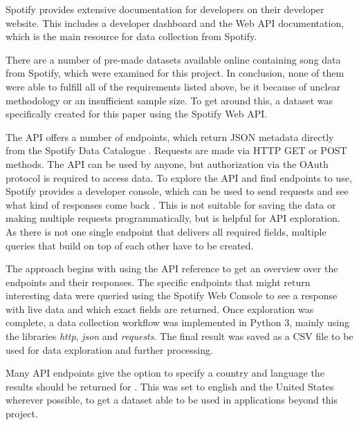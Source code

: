 Spotify provides extensive documentation for developers on their developer website.\cite{SpotifyDev}
This includes a developer dashboard and the Web API documentation, which is the main resource
for data collection from Spotify.

There are a number of pre-made datasets available online containing song data from Spotify,
which were examined for this project. In conclusion, none of them were able to fulfill
all of the requirements listed above, be it because of unclear methodology or an insufficient sample size.
To get around this, a dataset was specifically created for this paper using the Spotify Web API.

The \ac{API} offers a number of endpoints, which return \ac{JSON} metadata
directly from the Spotify Data Catalogue \cite{SpotifyWebAPI}.
Requests are made via HTTP GET or POST methods.
The \ac{API} can be used by anyone, but authorization via the OAuth protocol is required to access data.
To explore the \ac{API} and find endpoints to use, Spotify provides a developer console, which can be used to 
send requests and see what kind of responses come back \cite{SpotifyDevConsole}. This is not suitable for saving the data or making multiple
requests programmatically, but is helpful for API exploration. As there is not one single endpoint that delivers all
required fields, multiple queries that build on top of each other have to be created.

The approach begins with using the \ac{API} reference to get an overview over the endpoints and their responses.
The specific endpoints that might return interesting data were queried using the Spotify Web Console to see
a response with live data and which exact fields are returned.
Once exploration was complete, a data collection workflow was implemented in Python 3, mainly using the
libraries \emph{http}, \emph{json} and \emph{requests}. The final result was saved as a CSV file to be used for data exploration
and further processing.

Many API endpoints give the option to specify a country and language the results should be returned for \cite{SpotifyAPIRef}.
This was set to english and the United States wherever possible, to get a dataset able to be used
in applications beyond this project.

